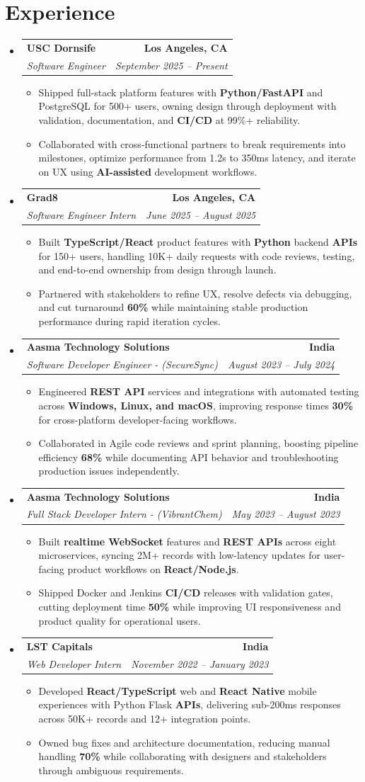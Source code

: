 \documentclass[letterpaper,10pt]{article}
\makeatletter
\newcommand{\resumeItem}[1]{\item\small{{#1 \vspace{-2pt}}}}
\newcommand{\resumeSubheading}[4]{\vspace{-1pt}\item\begin{tabular*}{1.0\textwidth}[t]{l@{\extracolsep{\fill}}r}\textbf{#1} & \textbf{\small #2} \\\textit{\small#3} & \textit{\small #4} \\\end{tabular*}\vspace{-2pt}}
\newcommand{\resumeSubHeadingListStart}{\begin{itemize}[leftmargin=0.0in, label={}]}
\newcommand{\resumeSubHeadingListEnd}{\end{itemize}}
\newcommand{\resumeItemListStart}{\begin{itemize}[leftmargin=0.15in,label=\textbullet,itemsep=2pt,topsep=0pt,parsep=0pt,partopsep=0pt]}
\newcommand{\resumeItemListEnd}{\end{itemize}\vspace{-4pt}}
\makeatother
\begin{document}
\section{Experience}
\resumeSubHeadingListStart
\resumeSubheading{USC Dornsife}{Los Angeles, CA}{Software Engineer}{September 2025 -- Present}
\resumeItemListStart
\resumeItem{Shipped full-stack platform features with \textbf{Python/FastAPI} and PostgreSQL for 500+ users, owning design through deployment with validation, documentation, and \textbf{CI/CD} at 99\%+ reliability.}
\resumeItem{Collaborated with cross-functional partners to break requirements into milestones, optimize performance from 1.2s to 350ms latency, and iterate on UX using \textbf{AI-assisted} development workflows.}
\resumeItemListEnd
\resumeSubheading{Grad8}{Los Angeles, CA}{Software Engineer Intern}{June 2025 -- August 2025}
\resumeItemListStart
\resumeItem{Built \textbf{TypeScript/React} product features with \textbf{Python} backend \textbf{APIs} for 150+ users, handling 10K+ daily requests with code reviews, testing, and end-to-end ownership from design through launch.}
\resumeItem{Partnered with stakeholders to refine UX, resolve defects via debugging, and cut turnaround \textbf{60\%} while maintaining stable production performance during rapid iteration cycles.}
\resumeItemListEnd
\resumeSubheading{Aasma Technology Solutions}{India}{Software Developer Engineer - (SecureSync)}{August 2023 -- July 2024}
\resumeItemListStart
\resumeItem{Engineered \textbf{REST API} services and integrations with automated testing across \textbf{Windows, Linux, and macOS}, improving response times \textbf{30\%} for cross-platform developer-facing workflows.}
\resumeItem{Collaborated in Agile code reviews and sprint planning, boosting pipeline efficiency \textbf{68\%} while documenting API behavior and troubleshooting production issues independently.}
\resumeItemListEnd
\resumeSubheading{Aasma Technology Solutions}{India}{Full Stack Developer Intern - (VibrantChem)}{May 2023 -- August 2023}
\resumeItemListStart
\resumeItem{Built \textbf{realtime WebSocket} features and \textbf{REST APIs} across eight microservices, syncing 2M+ records with low-latency updates for user-facing product workflows on \textbf{React/Node.js}.}
\resumeItem{Shipped Docker and Jenkins \textbf{CI/CD} releases with validation gates, cutting deployment time \textbf{50\%} while improving UI responsiveness and product quality for operational users.}
\resumeItemListEnd
\resumeSubheading{LST Capitals}{India}{Web Developer Intern}{November 2022 -- January 2023}
\resumeItemListStart
\resumeItem{Developed \textbf{React/TypeScript} web and \textbf{React Native} mobile experiences with Python Flask \textbf{APIs}, delivering sub-200ms responses across 50K+ records and 12+ integration points.}
\resumeItem{Owned bug fixes and architecture documentation, reducing manual handling \textbf{70\%} while collaborating with designers and stakeholders through ambiguous requirements.}
\resumeItemListEnd
\resumeSubHeadingListEnd
\vspace{-6pt}
\end{document}
